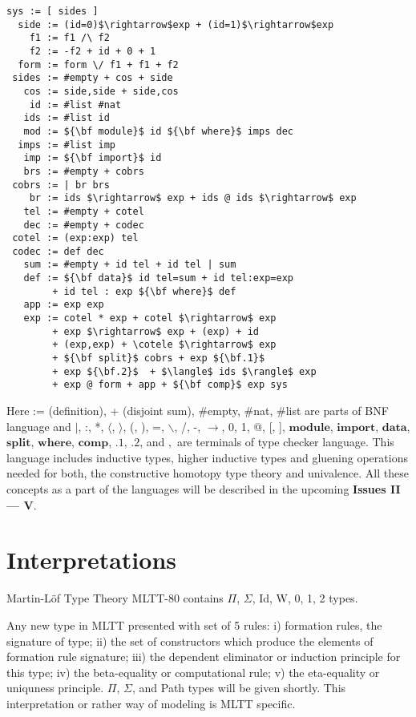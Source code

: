 \documentclass{article}
\theoremstyle{definition}
\begin{document}
\begin{lstlisting}[mathescape=true]
   sys := [ sides ]
  side := (id=0)$\rightarrow$exp + (id=1)$\rightarrow$exp
    f1 := f1 /\ f2
    f2 := -f2 + id + 0 + 1
  form := form \/ f1 + f1 + f2
 sides := #empty + cos + side
   cos := side,side + side,cos
    id := #list #nat
   ids := #list id
   mod := ${\bf module}$ id ${\bf where}$ imps dec
  imps := #list imp
   imp := ${\bf import}$ id
   brs := #empty + cobrs
 cobrs := | br brs
    br := ids $\rightarrow$ exp + ids @ ids $\rightarrow$ exp
   tel := #empty + cotel
   dec := #empty + codec
 cotel := (exp:exp) tel
 codec := def dec
   sum := #empty + id tel + id tel | sum
   def := ${\bf data}$ id tel=sum + id tel:exp=exp
        + id tel : exp ${\bf where}$ def
   app := exp exp
   exp := cotel * exp + cotel $\rightarrow$ exp
        + exp $\rightarrow$ exp + (exp) + id
        + (exp,exp) + \cotele $\rightarrow$ exp
        + ${\bf split}$ cobrs + exp ${\bf.1}$
        + exp ${\bf.2}$  + $\langle$ ids $\rangle$ exp
        + exp @ form + app + ${\bf comp}$ exp sys
\end{lstlisting}

Here := (definition), + (disjoint sum), \#empty, \#nat, \#list are parts of BNF language and
$\rvert$, :, *, $\langle$, $\rangle$, (, ), =, $\backslash$, /, -, $\rightarrow$, 0, 1, @, [, ],
$\mathbf{module}$, $\mathbf{import}$,
$\mathbf{data}$, $\mathbf{split}$, $\mathbf{where}$, $\mathbf{comp}$, $\mathbf{.1}$, $\mathbf{.2}$,
 and $,$ are terminals of type checker language. This language includes
inductive types, higher inductive types and gluening operations needed for
both, the constructive homotopy type theory and univalence. All these concepts as a part of the languages
will be described in the upcoming {\bf Issues II --- V}.

\section{Interpretations}

Martin-Löf Type Theory MLTT-80 contains $\Pi$, $\Sigma$, Id, W, 0, 1, 2 types.

Any new type in MLTT presented with set of 5 rules: i) formation rules, the signature of type;
ii) the set of constructors which produce the elements of formation rule signature;
iii) the dependent eliminator or induction principle for this type;
iv) the beta-equality or computational rule;
v) the eta-equality or uniquness principle. $\Pi$, $\Sigma$, and Path
types will be given shortly. This interpretation or rather way of modeling is MLTT specific.
\end{document}
